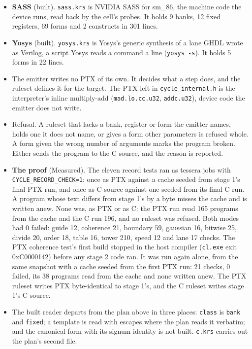 \begin{enumerate}
\begin{itemize}
\begin{enumerate}
\begin{itemize}
\begin{itemize}
\item \textbf{SASS} (built). \texttt{sass.\allowbreak{}krs} is NVIDIA SASS for sm\_\allowbreak{}86, the machine code the device runs, read back by the cell's probes. It holds 9 banks, 12 fixed registers, 69 forms and 2 constructs in 301 lines.
\item \textbf{Yosys} (built). \texttt{yosys.\allowbreak{}krs} is Yosys's generic synthesis of a lane GHDL wrote as Verilog, a script Yosys reads a command a line (\texttt{yosys -\allowbreak{}s}). It holds 5 forms in 22 lines.
\item The emitter writes no PTX of its own. It decides what a step does, and the ruleset defines it for the target. The PTX left in \texttt{cycle\_\allowbreak{}internal.\allowbreak{}h} is the interpreter's inline multiply-add (\texttt{mad.\allowbreak{}lo.\allowbreak{}cc.\allowbreak{}u32}, \texttt{addc.\allowbreak{}u32}), device code the emitter does not write.
\item Refusal. A ruleset that lacks a bank, register or form the emitter names, holds one it does not name, or gives a form other parameters is refused whole. A form given the wrong number of arguments marks the program broken. Either sends the program to the C source, and the reason is reported.
\item \textbf{The proof} (Measured). The eleven record tests ran as tessera jobs with \texttt{CYCLE\_\allowbreak{}RECORD\_\allowbreak{}CHECK=1}: once as PTX against a cache seeded from stage 1's final PTX run, and once as C source against one seeded from its final C run. A program whose text differs from stage 1's by a byte misses the cache and is written anew. None was, as PTX or as C: the PTX run read 165 programs from the cache and the C run 196, and no ruleset was refused. Both modes had 0 failed: guide 12, coherence 21, boundary 59, gaussian 16, bitwise 25, divide 20, order 18, table 16, tower 210, speed 12 and lane 17 checks. The PTX coherence test's first build stopped in the host compiler (\texttt{cl.\allowbreak{}exe} exit 0xC0000142) before any stage 2 code ran. It was run again alone, from the same snapshot with a cache seeded from the first PTX run: 21 checks, 0 failed, its 38 programs read from the cache and none written anew. The PTX ruleset writes PTX byte-identical to stage 1's, and the C ruleset writes stage 1's C source.
\item The built reader departs from the plan above in three places: \texttt{class} is \texttt{bank} and \texttt{fixed}; a template is read with escapes where the plan reads it verbatim; and the canonical form with its signum identity is not built. \texttt{c.\allowbreak{}krs} carries out the plan's second file.

\end{itemize}
\end{itemize}
\end{enumerate}
\end{itemize}
\end{enumerate}
